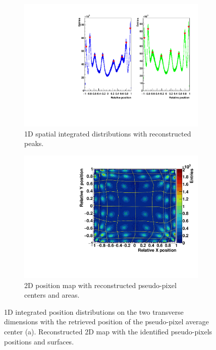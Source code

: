 \begin{figure}
\begin{subfigure}[t]{0.5\textwidth}
\centering
\includegraphics[width=1\textwidth]{03_GraphicFiles/chapter3_CLaRySproto/Absorber/images_charResults_Co60/3_Cal_XYProfiles_withPeaks.pdf}
\caption{1D spatial integrated distributions with reconstructed peaks.}
\label{chap3::fig::abslineColID}
\end{subfigure}
\begin{subfigure}[t]{0.5\textwidth}
\centering
\includegraphics[width=1\textwidth]{03_GraphicFiles/chapter3_CLaRySproto/Absorber/images_charResults_Co60/3_Cal_FLOODMAP_pixels_Regions.pdf}
\caption{2D position map with reconstructed pseudo-pixel centers and areas.}
\label{chap3::fig::absfloodWithPix}
\end{subfigure}
\caption{1D integrated position distributions on the two transverse dimensions with the retrieved position of the pseudo-pixel average center (a). Reconstructed 2D map with the identified pseudo-pixels positions and surfaces.}
\label{chap3::fig::abspixID_analysis}
\end{figure}

